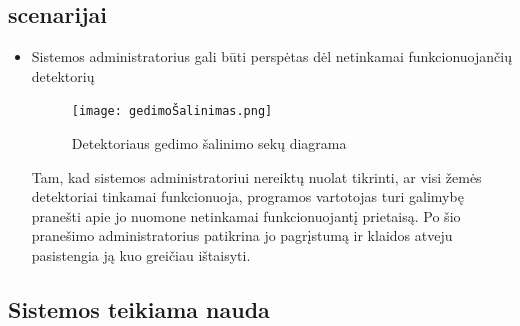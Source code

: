 \documentclass[oneside]{VUMIFPSkursinis}
\begin{document}
\subsection{scenarijai}
\begin{itemize}
\item Sistemos administratorius gali būti perspėtas dėl netinkamai funkcionuojančių detektorių
\begin{figure}[H]
		\centering	
	\texttt{[image: gedimoŠalinimas.png]}
	\caption{Detektoriaus gedimo šalinimo sekų diagrama}
	\label{fig:gedimoŠalinimas}
	\end{figure}
	Tam, kad sistemos administratoriui nereiktų nuolat tikrinti, ar visi žemės detektoriai tinkamai funkcionuoja, programos vartotojas turi galimybę pranešti apie jo nuomone netinkamai funkcionuojantį prietaisą. Po šio pranešimo administratorius patikrina jo pagrįstumą ir klaidos atveju pasistengia ją kuo greičiau ištaisyti.
\end{itemize}

\subsection{Sistemos teikiama nauda}
\end{document}
